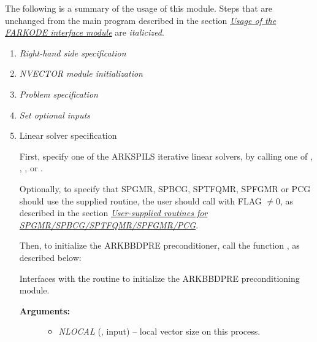 \documentclass[letterpaper,10pt,english]{sphinxmanual}
\begin{document}
The following is a summary of the usage of this module. Steps that are
unchanged from the main program described in the section
{\hyperref[f_interface/Usage:finterface-usage]{\emph{Usage of the FARKODE interface module}}} are \emph{italicized}.
\begin{enumerate}
\item {} 
\emph{Right-hand side specification}

\item {} 
\emph{NVECTOR module initialization}

\item {} 
\emph{Problem specification}

\item {} 
\emph{Set optional inputs}

\item {} 
Linear solver specification

First, specify one of the ARKSPILS iterative linear solvers, by
calling one of {\hyperref[f_interface/Usage:f/_/FARKSPGMR]{}}, {\hyperref[f_interface/Usage:f/_/FARKSPBCG]{}},
{\hyperref[f_interface/Usage:f/_/FARKSPTFQMR]{}}, {\hyperref[f_interface/Usage:f/_/FARKSPFGMR]{}} or
{\hyperref[f_interface/Usage:f/_/FARKPCG]{}}.

Optionally, to specify that SPGMR, SPBCG, SPTFQMR, SPFGMR or PCG
should use the supplied {\hyperref[f_interface/Usage:f/_/FARKJTIMES]{}} routine, the user
should call {\hyperref[f_interface/Usage:f/_/FARKSPILSSETJAC]{}} with FLAG $\ne 0$,
as described in the section {\hyperref[f_interface/Usage:finterface-spilsusersupplied]{\emph{User-supplied routines for SPGMR/SPBCG/SPTFQMR/SPFGMR/PCG}}}.

Then, to initialize the ARKBBDPRE preconditioner, call the function
{\hyperref[f_interface/Preconditioning:f/_/FARKBBDINIT]{}}, as described below:

\begin{fulllineitems}
\label{f_interface/Preconditioning:f/_/FARKBBDINIT}
Interfaces with the {\hyperref[c_interface/Preconditioners:ARKBBDPrecInit]{}}
routine to initialize the ARKBBDPRE preconditioning module.
\begin{description}
\item[{\textbf{Arguments:}}] \leavevmode\begin{itemize}
\item {} 
\emph{NLOCAL} (, input) -- local vector size on this
process.


\end{itemize}
\end{description}
\end{fulllineitems}
\end{enumerate}
\end{document}

